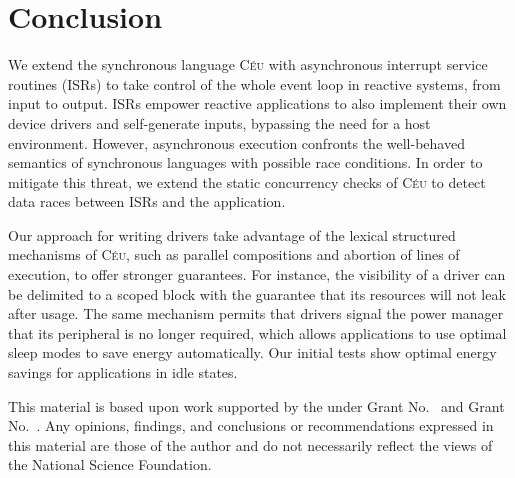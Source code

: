 \documentclass[sigplan,10pt,review,anonymous]{acmart}\settopmatter{printfolios=true,printccs=false,printacmref=false}
\newcommand{\CEU}{\textsc{C\'{e}u}\xspace}
\begin{document}
\section{Conclusion}

We extend the synchronous language \CEU with asynchronous interrupt service
routines (ISRs) to take control of the whole event loop in reactive systems,
from input to output.
%
ISRs empower reactive applications to also implement their own device drivers
and self-generate inputs, bypassing the need for a host environment.
%
However, asynchronous execution confronts the well-behaved semantics of
synchronous languages with possible race conditions.
%
In order to mitigate this threat, we extend the static concurrency checks of
\CEU to detect data races between ISRs and the application.

Our approach for writing drivers take advantage of the lexical structured
mechanisms of \CEU, such as parallel compositions and abortion of lines of
execution, to offer stronger guarantees.
%
For instance, the visibility of a driver can be delimited to a scoped block
with the guarantee that its resources will not leak after usage.
%
The same mechanism permits that drivers signal the power manager that its
peripheral is no longer required, which allows applications to use optimal
sleep modes to save energy automatically.
%
Our initial tests show optimal energy savings for applications in idle states.

\begin{acks}                            %
  This material is based upon work supported by the
   under Grant
  No.~ and Grant
  No.~.  Any opinions, findings, and
  conclusions or recommendations expressed in this material are those
  of the author and do not necessarily reflect the views of the
  National Science Foundation.
\end{acks}


\end{document}
